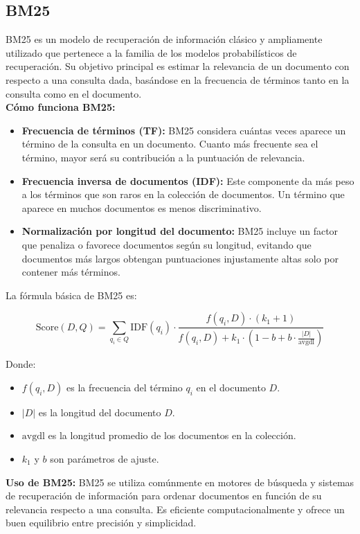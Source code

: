 \documentclass[runningheads]{llncs}
\begin{document}
\subsection*{BM25}

BM25 es un modelo de recuperación de información clásico y ampliamente utilizado que pertenece a la familia de los modelos probabilísticos de recuperación. Su objetivo principal es estimar la relevancia de un documento con respecto a una consulta dada, basándose en la frecuencia de términos tanto en la consulta como en el documento. \\

\textbf{Cómo funciona BM25:}
\begin{itemize}
    \item \textbf{Frecuencia de términos (TF):} BM25 considera cuántas veces aparece un término de la consulta en un documento. Cuanto más frecuente sea el término, mayor será su contribución a la puntuación de relevancia.
    \item \textbf{Frecuencia inversa de documentos (IDF):} Este componente da más peso a los términos que son raros en la colección de documentos. Un término que aparece en muchos documentos es menos discriminativo.
    \item \textbf{Normalización por longitud del documento:} BM25 incluye un factor que penaliza o favorece documentos según su longitud, evitando que documentos más largos obtengan puntuaciones injustamente altas solo por contener más términos.
\end{itemize}

La fórmula básica de BM25 es:

\[
\text{Score}(D, Q) = \sum_{q_i \in Q} \text{IDF}(q_i) \cdot \frac{f(q_i, D) \cdot (k_1 + 1)}{f(q_i, D) + k_1 \cdot (1 - b + b \cdot \frac{|D|}{\text{avgdl}})}
\]

Donde:
\begin{itemize}
    \item $f(q_i, D)$ es la frecuencia del término $q_i$ en el documento $D$.
    \item $|D|$ es la longitud del documento $D$.
    \item $\text{avgdl}$ es la longitud promedio de los documentos en la colección.
    \item $k_1$ y $b$ son parámetros de ajuste.
\end{itemize}

\textbf{Uso de BM25:}
BM25 se utiliza comúnmente en motores de búsqueda y sistemas de recuperación de información para ordenar documentos en función de su relevancia respecto a una consulta. Es eficiente computacionalmente y ofrece un buen equilibrio entre precisión y simplicidad.
\end{document}
